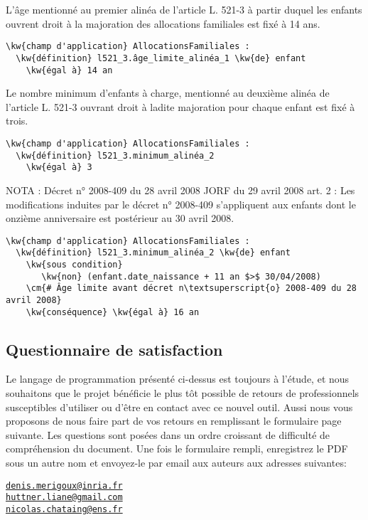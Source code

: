 \documentclass[12pt, french]{article}
\newcommand{\cm}[1]{\textbf{\textcolor{Gray}{#1}}}
\newcommand{\kw}[1]{\textbf{\textcolor{OliveGreen}{#1}}}
\begin{document}
L'âge mentionné au premier alinéa de l'article L. 521-3 à partir duquel les enfants ouvrent droit à la majoration des allocations familiales est fixé à 14 ans.
\begin{Verbatim}
\kw{champ d'application} AllocationsFamiliales :
  \kw{définition} l521_3.âge_limite_alinéa_1 \kw{de} enfant
    \kw{égal à} 14 an
\end{Verbatim}

Le nombre minimum d'enfants à charge, mentionné au deuxième alinéa de l'article L. 521-3 ouvrant droit à ladite majoration pour chaque enfant est fixé à trois.
\begin{Verbatim}
\kw{champ d'application} AllocationsFamiliales :
  \kw{définition} l521_3.minimum_alinéa_2
    \kw{égal à} 3
\end{Verbatim}


NOTA : Décret n° 2008-409 du 28 avril 2008 JORF du 29 avril 2008 art. 2 : Les modifications induites par le décret n° 2008-409 s'appliquent aux enfants dont le onzième anniversaire est postérieur au 30 avril 2008.

\begin{Verbatim}
\kw{champ d'application} AllocationsFamiliales :
  \kw{définition} l521_3.minimum_alinéa_2 \kw{de} enfant
    \kw{sous condition}
       \kw{non} (enfant.date_naissance + 11 an $>$ 30/04/2008)
    \cm{# Âge limite avant décret n\textsuperscript{o} 2008-409 du 28 avril 2008}
    \kw{conséquence} \kw{égal à} 16 an
\end{Verbatim}

\subsection{Questionnaire de satisfaction}

Le langage de programmation présenté ci-dessus est toujours à l'étude, et nous souhaitons que le projet bénéficie le plus tôt possible de retours de professionnels susceptibles d'utiliser ou d'être en contact avec ce nouvel outil. Aussi nous vous proposons de nous faire part de vos retours en remplissant le formulaire page suivante. Les questions sont posées dans un ordre croissant de difficulté de compréhension du document. Une fois le formulaire rempli, enregistrez le PDF sous un autre nom et envoyez-le par email aux auteurs aux adresses suivantes:

\begin{center}
  \href{mailto:denis.merigoux@inria.fr}{\texttt{denis.merigoux@inria.fr}}\\[0.5em]
  \href{mailto:huttner.liane@gmail.com}{\texttt{huttner.liane@gmail.com}}\\[0.5em]
  \href{mailto:nicolas.chataing@ens.fr}{\texttt{nicolas.chataing@ens.fr}}
\end{center}
\end{document}
